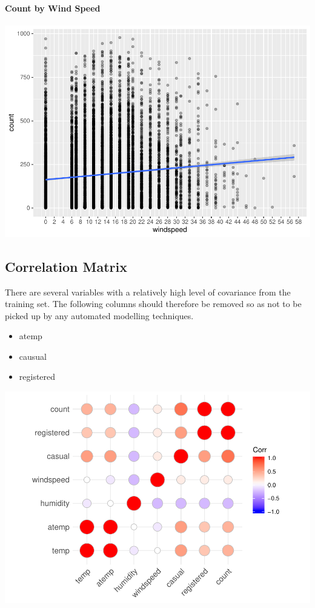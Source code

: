 \documentclass[american,]{article}
\providecommand{\tightlist}{%
  \setlength{\itemsep}{0pt}\setlength{\parskip}{0pt}}
\let\oldparagraph\paragraph
\renewcommand{\paragraph}[1]{\oldparagraph{#1}\mbox{}}
\begin{document}
\newpage

\hypertarget{count-by-wind-speed}{%
\paragraph{Count by Wind Speed}\label{count-by-wind-speed}}

\includegraphics{BikeSharingDemand_files/figure-latex/train.mod.1.windspeed-1.pdf}

\newpage

\hypertarget{correlation-matrix}{%
\subsection{Correlation Matrix}\label{correlation-matrix}}

There are several variables with a relatively high level of covariance from the training set. The following columns should therefore be removed so as not to be picked up by any automated modelling techniques.

\begin{itemize}
\tightlist
\item
  atemp
\item
  causual
\item
  registered
\end{itemize}

\includegraphics{BikeSharingDemand_files/figure-latex/train.mod.1.corr.matrix-1.pdf}
\end{document}
